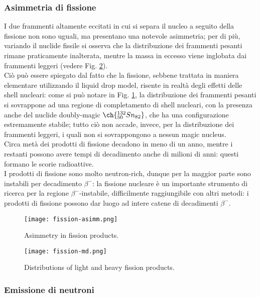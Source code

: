 \subsubsection{Asimmetria di fissione}

I due frammenti altamente eccitati in cui si separa il nucleo a seguito della fissione non sono uguali, ma presentano una notevole asimmetria; per di più, variando il nuclide fissile si osserva che la distribuzione dei frammenti pesanti rimane praticamente inalterata, mentre la massa in eccesso viene inglobata dai frammenti leggeri (vedere Fig. \ref{fission-md}).\\
Ciò può essere spiegato dal fatto che la fissione, sebbene trattata in maniera elementare utilizzando il liquid drop model, risente in realtà degli effetti delle shell nucleari: come si può notare in Fig. \ref{fission-asimm}, la distribuzione dei frammenti pesanti si sovrappone ad una regione di completamento di shell nucleari, con la presenza anche del nuclide doubly-magic $ \ch{^{132}_{50} Sn_{82}} $, che ha una configurazione estremamente stabile; tutto ciò non accade, invece, per la distribuzione dei frammenti leggeri, i quali non si sovrappongono a nessun magic nucleus.\\
Circa metà dei prodotti di fissione decadono in meno di un anno, mentre i restanti possono avere tempi di decadimento anche di milioni di anni: questi formano le scorie radioattive.\\
I prodotti di fissione sono molto neutron-rich, dunque per la maggior parte sono instabili per decadimento $ \beta^- $: la fissione nucleare è un importante strumento di ricerca per la regione $ \beta^- $-instabile, difficilmente raggiungibile con altri metodi: i prodotti di fissione possono dar luogo ad intere catene di decadimenti $ \beta^- $.

\begin{figure}
	\centering
	\texttt{[image: fission-asimm.png]}
	\caption{Asimmetry in fission products.}
	\label{fission-asimm}
\end{figure}
\begin{figure}
	\centering
	\texttt{[image: fission-md.png]}
	\caption{Distributions of light and heavy fission products.}
	\label{fission-md}
\end{figure}

\subsubsection{Emissione di neutroni}


